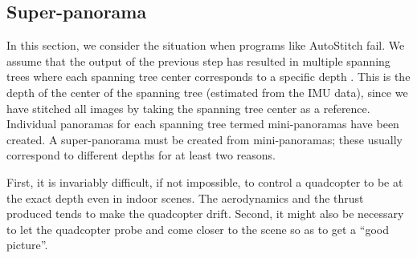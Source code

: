 \subsection{Super-panorama}
In this section, we consider the situation when programs like
AutoStitch fail.  We assume that the output of the previous step has
resulted in multiple spanning trees where each spanning tree center
corresponds to a specific depth . This is the depth of the center of
the spanning tree (estimated from the IMU data), since we have stitched all images by taking the
spanning tree center as a reference.  Individual panoramas for each
spanning tree termed mini-panoramas have been created. A
super-panorama must be created from mini-panoramas; these usually
correspond to different depths for at least two reasons.

First, it is invariably difficult, if not impossible, to control a
quadcopter to be at the exact depth even in indoor scenes.  The
aerodynamics and the thrust produced tends to make the quadcopter
drift.  Second, it might also be necessary to let the quadcopter probe
and come closer to the scene so as to get a ``good picture''.

